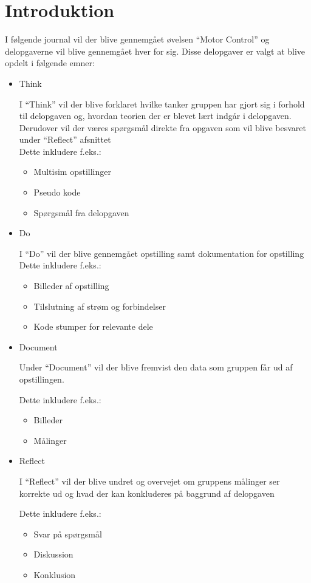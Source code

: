 \documentclass{article}
\begin{document}
\section{Introduktion}
I følgende journal vil der blive gennemgået øvelsen ``Motor Control'' og delopgaverne vil blive gennemgået hver for sig. Disse delopgaver er valgt at blive opdelt i følgende emner:
\begin{itemize}
\item Think

I ``Think'' vil der blive forklaret hvilke tanker gruppen har gjort sig i forhold til delopgaven og, hvordan teorien der er blevet lært indgår i delopgaven. Derudover vil der væres spørgsmål direkte fra opgaven som vil blive besvaret under ``Reflect'' afsnittet\\
Dette inkludere f.eks.:
\begin{itemize}
\item Multisim opstillinger
\item Pseudo kode
\item Spørgsmål fra delopgaven
\end{itemize}

\item Do

I ``Do'' vil der blive gennemgået opstilling samt dokumentation for opstilling
Dette inkludere f.eks.:
\begin{itemize}
\item Billeder af opstilling
\item Tilslutning af strøm og forbindelser
\item Kode stumper for relevante dele
\end{itemize}

\item Document

Under ``Document'' vil der blive fremvist den data som gruppen får ud af opstillingen.

Dette inkludere f.eks.:
\begin{itemize}
\item Billeder
\item Målinger
\end{itemize}


\item Reflect

I ``Reflect'' vil der blive undret og overvejet om gruppens målinger ser korrekte ud og hvad der kan konkluderes på baggrund af delopgaven

Dette inkludere f.eks.:
\begin{itemize}
\item Svar på spørgsmål
\item Diskussion
\item Konklusion
\end{itemize}

\end{itemize}
\end{document}
